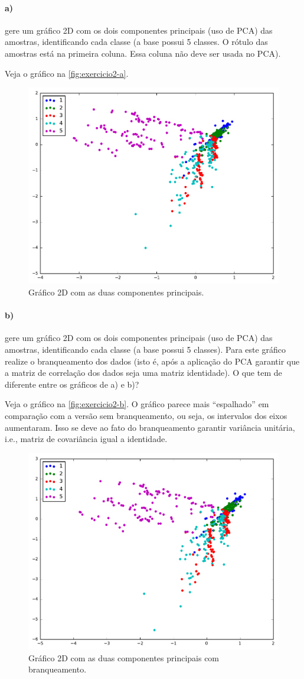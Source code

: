 \documentclass{article}
\begin{document}
\paragraph{a)} gere um gráfico 2D com os dois componentes principais (uso de PCA) das amostras, identificando cada classe (a base possui 5 classes. O rótulo das amostras está na primeira coluna. Essa coluna não deve ser usada no PCA).

Veja o gráfico na \autoref{fig:exercicio2-a}.

\begin{figure}[h]
	\centering
	\includegraphics[width=0.5\linewidth]{exercicio2-a.pdf}
	\caption{Gráfico 2D com as duas componentes principais.}
	\label{fig:exercicio2-a}
\end{figure}

\paragraph{b)} gere um gráfico 2D com os dois componentes principais (uso de PCA) das amostras, identificando cada classe (a base possui 5 classes). Para este gráfico realize o branqueamento dos dados (isto é, após a aplicação do PCA garantir que a matriz de correlação dos dados seja uma matriz identidade). O que tem de diferente entre os gráficos de a) e b)?

Veja o gráfico na \autoref{fig:exercicio2-b}. O gráfico parece mais ``espalhado'' em comparação com a versão sem branqueamento, ou seja, os intervalos dos eixos aumentaram. Isso se deve ao fato do branqueamento garantir variância unitária, i.e., matriz de covariância igual a identidade.

\begin{figure}[h]
	\centering
	\includegraphics[width=0.5\linewidth]{exercicio2-b.pdf}
	\caption{Gráfico 2D com as duas componentes principais com branqueamento.}
	\label{fig:exercicio2-b}
\end{figure}
\end{document}
